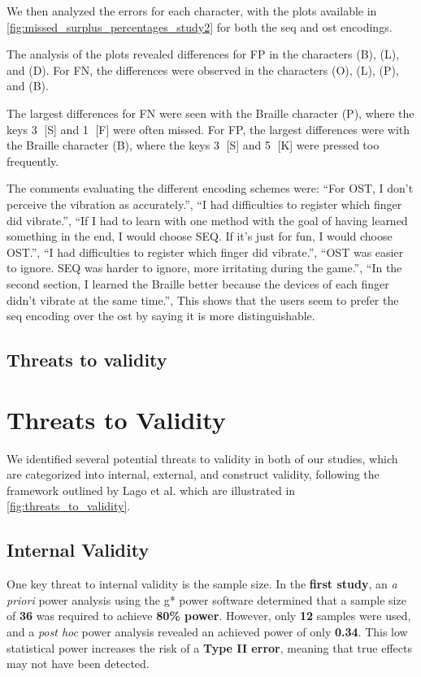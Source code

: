 We then analyzed the errors for each character, with the plots available in \autoref{fig:missed_surplus_percentages_study2} for both the \gls{seq} and \gls{ost} encodings.

The analysis of the plots revealed differences for FP in the characters (B), (L), and (D). For FN, the differences were observed in the characters (O), (L), (P), and (B).

The largest differences for FN were seen with the Braille character (P), where the keys \textcircled{3} [S] and \textcircled{1} [F] were often missed. For FP, the largest differences were with the Braille character (B), where the keys \textcircled{3} [S] and \textcircled{5} [K] were pressed too frequently.

The comments evaluating the different encoding schemes were:
\enquote{For OST, I don't perceive the vibration as accurately.},
\enquote{I had difficulties to register which finger did vibrate.},
\enquote{If I had to learn with one method with the goal of having learned something in the end, I would choose SEQ. If it's just for fun, I would choose OST.},
\enquote{I had difficulties to register which finger did vibrate.},
\enquote{OST was easier to ignore. SEQ was harder to ignore, more irritating during the game.},
\enquote{In the second section, I learned the Braille better because the devices of each finger didn’t vibrate at the same time.},
This shows that the users seem to prefer the \gls{seq} encoding over the \gls{ost} by saying it is more distinguishable.


\subsection{Threats to validity}
\section{Threats to Validity}

We identified several potential threats to validity in both of our studies, which are categorized into internal, external, and construct validity, following the framework outlined by Lago et al. \cite{10.1145/3674805.3686691} which are illustrated in \autoref{fig:threats_to_validity}.

\subsection{Internal Validity}
One key threat to internal validity is the sample size. In the \textbf{first study}, an \textit{a priori} power analysis using the g* power software determined that a sample size of \textbf{36} was required to achieve \textbf{80\% power}. However, only \textbf{12} samples were used, and a \textit{post hoc} power analysis revealed an achieved power of only \textbf{0.34}. This low statistical power increases the risk of a \textbf{Type II error}, meaning that true effects may not have been detected. 

